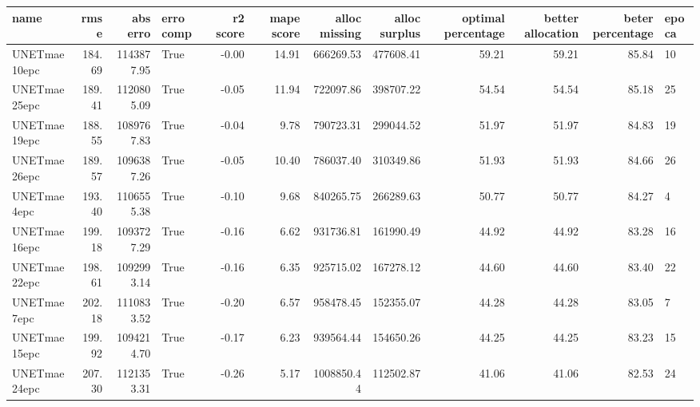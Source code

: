 \begin{tabular}{lrrlrrrrrrrl}
\toprule
name & rmse & abs erro & erro comp & r2 score & mape score & alloc missing & alloc surplus & optimal percentage & better allocation & beter percentage & epoca \\
\midrule
UNETmae10epc & 184.69 & 1143877.95 & True & -0.00 & 14.91 & 666269.53 & 477608.41 & 59.21 & 59.21 & 85.84 & 10 \\
UNETmae25epc & 189.41 & 1120805.09 & True & -0.05 & 11.94 & 722097.86 & 398707.22 & 54.54 & 54.54 & 85.18 & 25 \\
UNETmae19epc & 188.55 & 1089767.83 & True & -0.04 & 9.78 & 790723.31 & 299044.52 & 51.97 & 51.97 & 84.83 & 19 \\
UNETmae26epc & 189.57 & 1096387.26 & True & -0.05 & 10.40 & 786037.40 & 310349.86 & 51.93 & 51.93 & 84.66 & 26 \\
UNETmae4epc & 193.40 & 1106555.38 & True & -0.10 & 9.68 & 840265.75 & 266289.63 & 50.77 & 50.77 & 84.27 & 4 \\
UNETmae16epc & 199.18 & 1093727.29 & True & -0.16 & 6.62 & 931736.81 & 161990.49 & 44.92 & 44.92 & 83.28 & 16 \\
UNETmae22epc & 198.61 & 1092993.14 & True & -0.16 & 6.35 & 925715.02 & 167278.12 & 44.60 & 44.60 & 83.40 & 22 \\
UNETmae7epc & 202.18 & 1110833.52 & True & -0.20 & 6.57 & 958478.45 & 152355.07 & 44.28 & 44.28 & 83.05 & 7 \\
UNETmae15epc & 199.92 & 1094214.70 & True & -0.17 & 6.23 & 939564.44 & 154650.26 & 44.25 & 44.25 & 83.23 & 15 \\
UNETmae24epc & 207.30 & 1121353.31 & True & -0.26 & 5.17 & 1008850.44 & 112502.87 & 41.06 & 41.06 & 82.53 & 24 \\
\bottomrule
\end{tabular}
